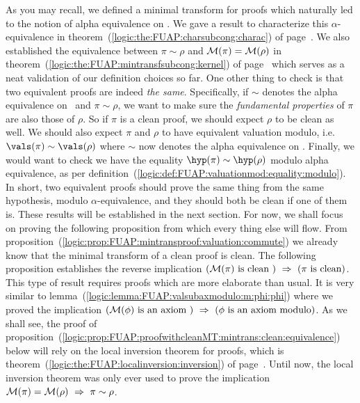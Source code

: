 As you may recall, we defined a minimal transform for proofs which
naturally led to the notion of alpha equivalence on \pvs. We
gave a result to characterize this $\alpha$-equivalence in
theorem~(\ref{logic:the:FUAP:charsubcong:charac}) of
page~\pageref{logic:the:FUAP:charsubcong:charac}. We also
established the equivalence between $\pi\sim\rho$ and ${\cal
M}(\pi)={\cal M}(\rho)$ in
theorem~(\ref{logic:the:FUAP:mintransfsubcong:kernel}) of
page~\pageref{logic:the:FUAP:mintransfsubcong:kernel} which serves
as a neat validation of our definition choices so far. One other
thing to check is that two equivalent proofs are indeed {\em the
same}. Specifically, if $\sim$ denotes the alpha equivalence
on \pvs\ and $\pi\sim\rho$, we want to make sure the {\em
fundamental properties} of $\pi$ are also those of $\rho$. So if
$\pi$ is a clean proof, we should expect $\rho$ to be clean as well.
We should also expect $\pi$ and $\rho$ to have equivalent valuation
modulo, i.e. $\vals(\pi)\sim\vals(\rho)$ where $\sim$ now denotes
the alpha equivalence on \pv. Finally, we would want to check
we have the equality $\hyp(\pi)\sim\hyp(\rho)$ modulo alpha 
equivalence, as per
definition~(\ref{logic:def:FUAP:valuationmod:equality:modulo}). In
short, two equivalent proofs should prove the same thing from the
same hypothesis, modulo $\alpha$-equivalence, and they should both
be clean if one of them is. These results will be established in the
next section. For now, we shall focus on proving the following
proposition from which every thing else will flow. From
proposition~(\ref{logic:prop:FUAP:mintransproof:valuation:commute})
we already know that  the minimal transform of a clean proof is
clean. The following proposition establishes the reverse implication
$({\cal M}(\pi)\mbox{ is clean })\ \Rightarrow\ (\pi\mbox{ is
clean})$. This type of result requires proofs which are more
elaborate than usual. It is very similar to
lemma~(\ref{logic:lemma:FUAP:valsubaxmodulo:m:phi:phi}) where we
proved the implication $({\cal M}(\phi)\mbox{ is an axiom })\
\Rightarrow\ (\phi\mbox{ is an axiom modulo})$. As we shall see, the
proof of
proposition~(\ref{logic:prop:FUAP:proofwithcleanMT:mintrans:clean:equivalence})
below will rely on the local inversion theorem for proofs, which is
theorem~(\ref{logic:the:FUAP:localinversion:inversion}) of
page~\pageref{logic:the:FUAP:localinversion:inversion}. Until now,
the local inversion theorem was only ever used to prove the
implication ${\cal M}(\pi)={\cal M}(\rho)\ \Rightarrow\
\pi\sim\rho$.

